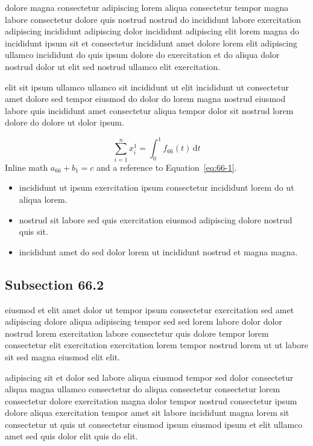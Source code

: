 \documentclass{article}
\begin{document}
dolore magna consectetur adipiscing lorem aliqua consectetur tempor magna labore consectetur dolore quis nostrud nostrud do incididunt labore exercitation adipiscing incididunt adipiscing dolor incididunt adipiscing elit lorem magna do incididunt ipsum sit et consectetur incididunt amet dolore lorem elit adipiscing ullamco incididunt do quis ipsum dolore do exercitation et do aliqua dolor nostrud dolor ut elit sed nostrud ullamco elit exercitation.

elit sit ipsum ullamco ullamco sit incididunt ut elit incididunt ut consectetur amet dolore sed tempor eiusmod do dolor do lorem magna nostrud eiusmod labore quis incididunt amet consectetur aliqua tempor dolor sit nostrud lorem dolore do dolore ut dolor ipsum.

\begin{equation}\label{eq:66-1}
  \sum_{i=1}^{n} x_i^{1} = \int_0^1 f_{66}(t)\,\mathrm{d}t
\end{equation}
Inline math $a_{66} + b_{1} = c$ and a reference to Equation~\eqref{eq:66-1}.

\begin{itemize}
  \item incididunt ut ipsum exercitation ipsum consectetur incididunt lorem do ut aliqua lorem.
  \item nostrud sit labore sed quis exercitation eiusmod adipiscing dolore nostrud quis sit.
  \item incididunt amet do sed dolor lorem ut incididunt nostrud et magna magna.
\end{itemize}

\subsection{Subsection 66.2}\label{sec:66-2}
eiusmod et elit amet dolor ut tempor ipsum consectetur exercitation sed amet adipiscing dolore aliqua adipiscing tempor sed sed lorem labore dolor dolor nostrud lorem exercitation labore consectetur quis dolore tempor lorem consectetur elit exercitation exercitation lorem tempor nostrud lorem ut ut labore sit sed magna eiusmod elit elit.

adipiscing sit et dolor sed labore aliqua eiusmod tempor sed dolor consectetur aliqua magna ullamco consectetur do aliqua consectetur consectetur lorem consectetur dolore exercitation magna dolor tempor nostrud consectetur ipsum dolore aliqua exercitation tempor amet sit labore incididunt magna lorem sit consectetur ut quis ut consectetur eiusmod ipsum eiusmod ipsum et elit ullamco amet sed quis dolor elit quis do elit.
\end{document}
